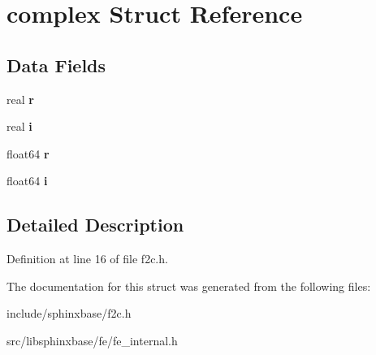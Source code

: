 \section{complex Struct Reference}
\label{structcomplex}
\subsection*{Data Fields}
\begin{DoxyCompactItemize}
\item 
real {\bfseries r}\label{structcomplex_a03cba9844d71e49f4ddf7c5f3dd45822}

\item 
real {\bfseries i}\label{structcomplex_aa55283d87e8d89c794bac746fb11d524}

\item 
float64 {\bfseries r}\label{structcomplex_ab074de5c97259ff1d0c495e8ff3fdc89}

\item 
float64 {\bfseries i}\label{structcomplex_a94348f29e0746c91409bf02b270ec5d0}

\end{DoxyCompactItemize}


\subsection{Detailed Description}


Definition at line 16 of file f2c.\-h.



The documentation for this struct was generated from the following files\-:\begin{DoxyCompactItemize}
\item 
include/sphinxbase/f2c.\-h\item 
src/libsphinxbase/fe/fe\-\_\-internal.\-h\end{DoxyCompactItemize}
